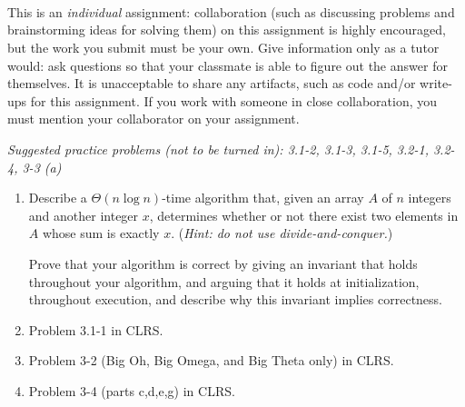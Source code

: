 \documentclass[letterpaper,11pt]{article}
\begin{document}


 \\

 \\

 \\

This is an \emph{individual} assignment: collaboration (such as discussing problems and brainstorming ideas for solving them) on this assignment is highly encouraged, but the work you submit must be your own. Give information only as a tutor would: ask questions so that your classmate is able to figure out the answer for themselves. It is unacceptable to share any artifacts, such as code and/or write-ups for this assignment. If you work with someone in close collaboration, you must mention your collaborator on your assignment.

\emph{Suggested practice problems (not to be turned in): 3.1-2, 3.1-3, 3.1-5, 3.2-1, 3.2-4, 3-3 (a)}

\begin{enumerate}
\item Describe a $\Theta(n\log n)$-time algorithm that, given an array $A$ of $n$ integers and another integer $x$, determines whether or not there exist two elements in $A$ whose sum is exactly $x$. (\emph{Hint: do not use divide-and-conquer.})

Prove that your algorithm is correct by giving an invariant that holds throughout your algorithm, and arguing that it holds at initialization, throughout execution, and describe why this invariant implies correctness.

\item Problem 3.1-1 in CLRS.
\item Problem 3-2 (Big Oh, Big Omega, and Big Theta only) in CLRS.
\item Problem 3-4 (parts c,d,e,g) in CLRS.

\end{enumerate}
\end{document}
